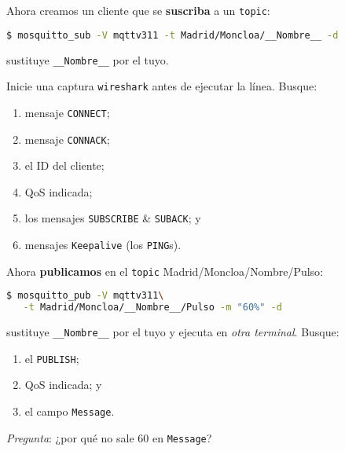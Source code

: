 \documentclass[xcolor={x11names}]{beamer}
\begin{document}
\begin{frame}[fragile]{\secname}
    Ahora creamos un cliente que
    se \textbf{suscriba} a un \texttt{topic}:
\begin{lstlisting}[language=bash]
$ mosquitto_sub -V mqttv311 -t Madrid/Moncloa/__Nombre__ -d
\end{lstlisting}
sustituye \verb|__Nombre__| por el tuyo.


Inicie una captura \texttt{wireshark} antes
de ejecutar la línea. Busque:
\begin{enumerate}
    \item mensaje \texttt{CONNECT};
    \item mensaje \texttt{CONNACK};
    \item el ID del cliente;
    \item QoS indicada;
    \item los mensajes \texttt{SUBSCRIBE} \& \texttt{SUBACK}; y
    \item mensajes \texttt{Keepalive} (los \texttt{PING}s).
\end{enumerate}
\end{frame}

















\begin{frame}[fragile]{\secname}
    Ahora \textbf{publicamos} en el \texttt{topic}
    {\color{Firebrick3}Madrid}/{\color{Gold3}Moncloa}/{\color{DodgerBlue3}Nombre}/{\color{OliveDrab4}Pulso}:
\begin{lstlisting}[language=bash]
$ mosquitto_pub -V mqttv311\
   -t Madrid/Moncloa/__Nombre__/Pulso -m "60%" -d
\end{lstlisting}


sustituye \verb|__Nombre__| por el tuyo
y ejecuta en \emph{otra terminal}. Busque:
\begin{enumerate}
    \item el \texttt{PUBLISH};
    \item QoS indicada; y
    \item el campo \texttt{Message}.
\end{enumerate}

\vspace{1em}

\emph{Pregunta}: ¿por qué no sale 60 en \texttt{Message}?

\end{frame}
\end{document}
